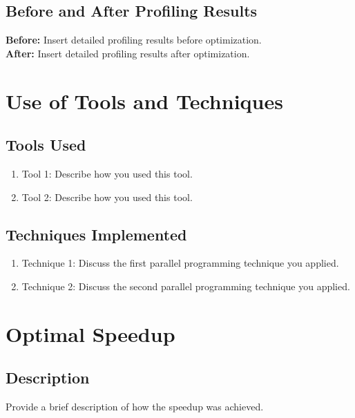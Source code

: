 \documentclass[12pt]{article}
\begin{document}
    \subsection{Before and After Profiling Results}
    \textbf{Before:} Insert detailed profiling results before optimization. \\
    \textbf{After:} Insert detailed profiling results after optimization.


    \section{Use of Tools and Techniques}

    \subsection{Tools Used}
    \begin{enumerate}
        \item Tool 1: Describe how you used this tool.
        \item Tool 2: Describe how you used this tool.
    \end{enumerate}

    \subsection{Techniques Implemented}
    \begin{enumerate}
        \item Technique 1: Discuss the first parallel programming technique you applied.
        \item Technique 2: Discuss the second parallel programming technique you applied.
    \end{enumerate}


    \section{Optimal Speedup}

    \subsection{Description}
    Provide a brief description of how the speedup was achieved.
    \newpage
\end{document}
